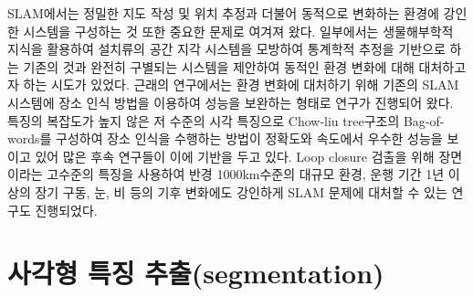 \documentclass[master,korean,final]{cbnu-ecs}
\begin{document}
SLAM에서는 정밀한 지도 작성 및 위치 추정과 더불어 동적으로 변화하는 환경에 강인한 시스템을 구성하는 것 또한 중요한 문제로 여겨져 왔다. 일부에서는 생물해부학적 지식을 활용하여 설치류의 공간 지각 시스템을 모방하여 통계학적 추정을 기반으로 하는 기존의 것과 완전히 구별되는 시스템을 제안하여 동적인 환경 변화에 대해 대처하고자 하는 시도가 있었다\cite{Milford2008}. 근래의 연구에서는 환경 변화에 대처하기 위해 기존의 SLAM시스템에 장소 인식 방법을 이용하여 성능을 보완하는 형태로 연구가 진행되어 왔다. 특징의 복잡도가 높지 않은 저 수준의 시각 특징으로 Chow-liu tree구조의 Bag-of-words를 구성하여 장소 인식을 수행하는 방법\cite{Cummins2011}이 정확도와 속도에서 우수한 성능을 보이고 있어 많은 후속 연구들이 이에 기반을 두고 있다. Loop closure 검출을 위해 장면이라는 고수준의 특징을 사용하여 반경 1000km수준의 대규모 환경, 운행 기간 1년 이상의 장기 구동, 눈, 비 등의 기후 변화에도 강인하게 SLAM 문제에 대처할 수 있는 연구도 진행되었다\cite{Milford2012}.

\cite{Zhang2015}%
\cite{Moreno2013}%
\cite{Lu2014c}%
\cite{Li2014}%


\chapter{사각형 특징 추출(segmentation)}
\cite{Zhang2003}%
\cite{Han2009}%
\cite{Wildenauer2008}%
\cite{Jung2004}%
\cite{Bazin2007}%
\cite{Bhaskar2010}%

\end{document}
